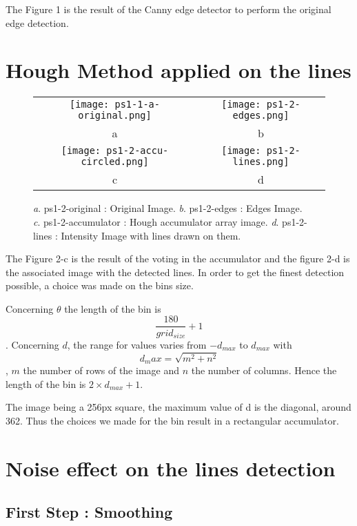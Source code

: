 \documentclass[a4paper,11pt]{article}
\begin{document}
The Figure 1 is the result of the Canny edge detector to perform the original edge detection.

\section{Hough Method applied on the lines}

 \begin{figure}[H]
\begin{center}
\begin{tabular}{cc}
	\texttt{[image: ps1-1-a-original.png]}&
	\texttt{[image: ps1-2-edges.png]}\\
	a&b\\
	\texttt{[image: ps1-2-accu-circled.png]}&
	\texttt{[image: ps1-2-lines.png]}\\
	c&d\\
\end{tabular}
\end{center}
\caption{ 
\textit{a}. ps1-2-original : Original Image.  \textit{b}. ps1-2-edges : Edges Image. \\
\textit{c}. ps1-2-accumulator : Hough accumulator array image. \textit{d}. ps1-2-lines : Intensity Image with lines drawn on them.}
\label{ps1-2}
\end{figure}

The Figure 2-c is the result of the voting in the accumulator and the figure 2-d is the associated image with the detected lines. 
In order to get the finest detection possible, a choice was made on the bins size.

Concerning $\theta$  the length of the bin is $$\frac{180}{grid_{size}} + 1$$.
Concerning $d$, the range for values varies from $-d_{max}$ to ${d_{max}}$ with $$d_max = \sqrt{m^2+n^2}$$, $m$ the number of rows of the image and $n$ the number of columns. Hence the length of the bin is $2 \times d_{max}+1$.

The image being a 256px square, the maximum value of d is the diagonal, around 362. Thus the choices we made for the bin result in a rectangular accumulator.

\section{Noise effect on the lines detection}


\subsection{First Step : Smoothing}
\end{document}
